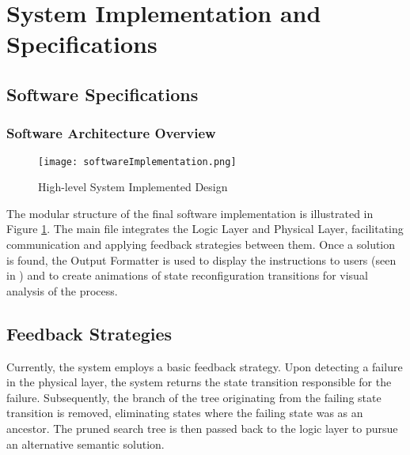 \section{System Implementation and Specifications}



\subsection{Software Specifications}
\subsubsection{Software Architecture Overview}
\begin{figure}[H]
	\centering
	\texttt{[image: softwareImplementation.png]}
	\caption{High-level System Implemented Design}
	\label{systemImplementation}
\end{figure}
The modular structure of the final software implementation is illustrated in Figure \ref{systemImplementation}. The main file integrates the Logic Layer and Physical Layer, facilitating communication and applying feedback strategies between them. Once a solution is found, the Output Formatter is used to display the instructions to users (seen in ) and to create animations of state reconfiguration transitions for visual analysis of the process.




\subsection{Feedback Strategies}
Currently, the system employs a basic feedback strategy. Upon detecting a failure in the physical layer, the system returns the state transition responsible for the failure. Subsequently, the branch of the tree originating from the failing state transition is removed, eliminating states where the failing state was as an ancestor. The pruned search tree is then passed back to the logic layer to pursue an alternative semantic solution.



